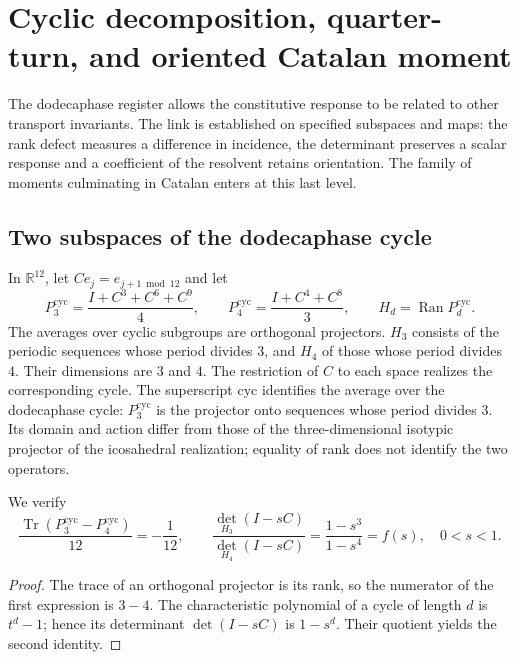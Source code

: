 \section{Cyclic decomposition, quarter-turn, and oriented Catalan moment}
\label{iii:iii:sec:catalan}

The dodecaphase register allows the constitutive response to be related to
other transport invariants. The link is established on specified subspaces
and maps: the rank defect measures a difference in
incidence, the determinant preserves a scalar response and a coefficient
of the resolvent retains orientation. The family of moments culminating
in Catalan enters at this last level.

\subsection{Two subspaces of the dodecaphase cycle}

In $\mathbb R^{12}$, let $C e_j=e_{j+1\bmod12}$ and let
\begin{equation}
 P_3^{\mathrm{cyc}}=\frac{I+C^3+C^6+C^9}{4},\qquad
 P_4^{\mathrm{cyc}}=\frac{I+C^4+C^8}{3},\qquad
 H_d=\operatorname{Ran}P_d^{\mathrm{cyc}}.
 \label{iii:iii:eq:projectors34}
\end{equation}
The averages over cyclic subgroups are orthogonal projectors.
$H_3$ consists of the periodic sequences whose period divides $3$,
and $H_4$ of those whose period divides $4$. Their dimensions are $3$ and $4$.
The restriction of $C$ to each space realizes the corresponding cycle.
The superscript $\mathrm{cyc}$ identifies the average over the dodecaphase cycle:
$P_3^{\mathrm{cyc}}$ is the projector onto sequences whose period divides
$3$. Its domain and action differ from those of the three-dimensional
isotypic projector of the icosahedral realization; equality of rank
does not identify the two operators.

\begin{proposition}
We verify
\begin{equation}
 \frac{\operatorname{Tr}(P_3^{\mathrm{cyc}}-P_4^{\mathrm{cyc}})}{12}=-\frac1{12},\qquad
 \frac{\det_{H_3}(I-sC)}{\det_{H_4}(I-sC)}
 =\frac{1-s^3}{1-s^4}=f(s),\quad 0<s<1.
 \label{iii:iii:eq:trace-det}
\end{equation}
\end{proposition}
\begin{proof}
The trace of an orthogonal projector is its rank, so the numerator
of the first expression is $3-4$. The characteristic polynomial of a cycle
of length $d$ is $t^d-1$; hence its determinant $\det(I-sC)$ is
$1-s^d$. Their quotient yields the second identity.
\end{proof}

